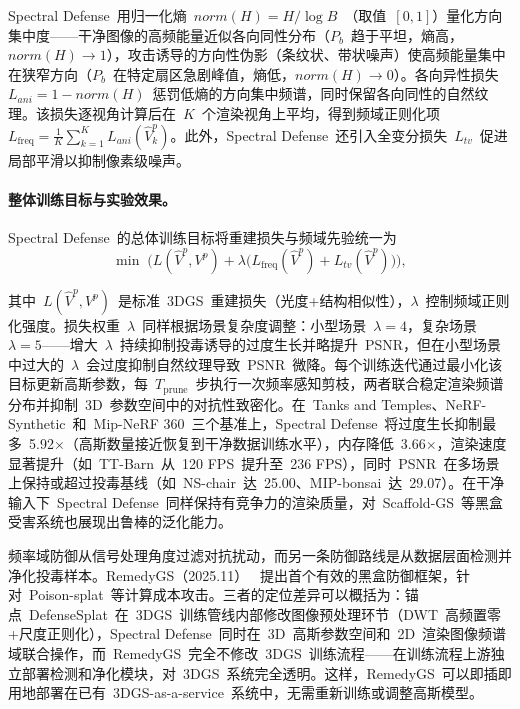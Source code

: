 Spectral Defense~用归一化熵~$norm(H) = H / \log B$~（取值~$[0,1]$）量化方向集中度——干净图像的高频能量近似各向同性分布（$P_b$~趋于平坦，熵高，$norm(H) \to 1$），攻击诱导的方向性伪影（条纹状、带状噪声）使高频能量集中在狭窄方向（$P_b$~在特定扇区急剧峰值，熵低，$norm(H) \to 0$）。各向异性损失~$L_{ani} = 1 - norm(H)$~惩罚低熵的方向集中频谱，同时保留各向同性的自然纹理。该损失逐视角计算后在~$K$~个渲染视角上平均，得到频域正则化项~$L_{\text{freq}} = \frac{1}{K}\sum_{k=1}^{K} L_{ani}(\hat{V}_k^p)$。此外，Spectral Defense~还引入全变分损失~$L_{tv}$~促进局部平滑以抑制像素级噪声。

\paragraph{整体训练目标与实验效果。}
Spectral Defense~的总体训练目标将重建损失与频域先验统一为
\begin{equation}
\min \; \bigl( L(\hat{V}^p, V^p) + \lambda \bigl( L_{\text{freq}}(\hat{V}^p) + L_{tv}(\hat{V}^p) \bigr) \bigr),
\end{equation}

其中~$L(\hat{V}^p, V^p)$~是标准~3DGS~重建损失（光度+结构相似性），$\lambda$~控制频域正则化强度。损失权重~$\lambda$~同样根据场景复杂度调整：小型场景~$\lambda=4$，复杂场景~$\lambda=5$——增大~$\lambda$~持续抑制投毒诱导的过度生长并略提升~PSNR，但在小型场景中过大的~$\lambda$~会过度抑制自然纹理导致~PSNR~微降。每个训练迭代通过最小化该目标更新高斯参数，每~$T_{\text{prune}}$~步执行一次频率感知剪枝，两者联合稳定渲染频谱分布并抑制~3D~参数空间中的对抗性致密化。在~Tanks and Temples、NeRF-Synthetic~和~Mip-NeRF 360~三个基准上，Spectral Defense~将过度生长抑制最多~5.92$\times$（高斯数量接近恢复到干净数据训练水平），内存降低~3.66$\times$，渲染速度显著提升（如~TT-Barn~从~120 FPS~提升至~236 FPS），同时~PSNR~在多场景上保持或超过投毒基线（如~NS-chair~达~25.00、MIP-bonsai~达~29.07）。在干净输入下~Spectral Defense~同样保持有竞争力的渲染质量，对~Scaffold-GS~等黑盒受害系统也展现出鲁棒的泛化能力。

频率域防御从信号处理角度过滤对抗扰动，而另一条防御路线是从数据层面检测并净化投毒样本。RemedyGS（2025.11）~\cite{2511_22147} 提出首个有效的黑盒防御框架，针对~Poison-splat~等计算成本攻击。三者的定位差异可以概括为：锚点~DefenseSplat~在~3DGS~训练管线内部修改图像预处理环节（DWT~高频置零+尺度正则化），Spectral Defense~同时在~3D~高斯参数空间和~2D~渲染图像频谱域联合操作，而~RemedyGS~完全不修改~3DGS~训练流程——在训练流程上游独立部署检测和净化模块，对~3DGS~系统完全透明。这样，RemedyGS~可以即插即用地部署在已有~3DGS-as-a-service~系统中，无需重新训练或调整高斯模型。

